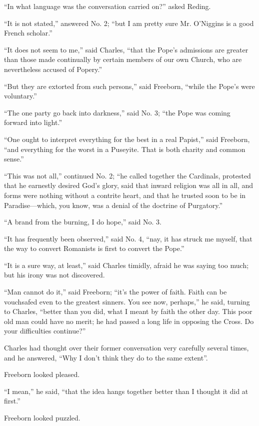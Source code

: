 ``In what language was the conversation carried on?'' asked
Reding.

``It is not stated,'' answered No. 2; ``but I am pretty
sure Mr. O'Niggins is a good French scholar.''

``It does not seem to me,'' said Charles, ``that the
Pope's admissions are greater than those made continually by certain
members of our own Church, who are nevertheless accused of
Popery.''

``But they are extorted from such persons,'' said Freeborn,
``while the Pope's were voluntary.''

``The one party go back into darkness,'' said No. 3;
``the Pope was coming forward into light.''

``One ought to interpret everything for the best in a real
Papist,'' said Freeborn, ``and everything for the worst in a
Puseyite. That is both charity and common sense.''

``This was not all,'' continued No. 2; ``he called
together the Cardinals, protested that he earnestly desired God's
glory, said that inward religion was all in all, and forms were
nothing without a contrite heart, and that he trusted soon to be in
Paradise—which, you know, was a denial of the doctrine of
Purgatory.''

``A brand from the burning, I do hope,'' said No. 3.

``It has frequently been observed,'' said No. 4, ``nay,
it has struck me myself, that the way to convert Romanists is first to
convert the Pope.''

``It is a sure way, at least,'' said Charles timidly,
afraid he was saying too much; but his irony was not discovered.

``Man cannot do it,'' said Freeborn; ``it's the power
of faith. Faith can be vouchsafed even to the greatest sinners.
You see now, perhaps,'' he said, turning to Charles, ``better
than you did, what I meant by faith the other day. This poor old man
could have no merit; he had passed a long life in opposing the Cross.
Do your difficulties continue?''

Charles had thought over their former conversation very carefully
several times, and he answered, ``Why I don't think they do to the
same extent''.

Freeborn looked pleased.

``I mean,'' he said, ``that the idea hangs together
better than I thought it did at first.''

Freeborn looked puzzled.

